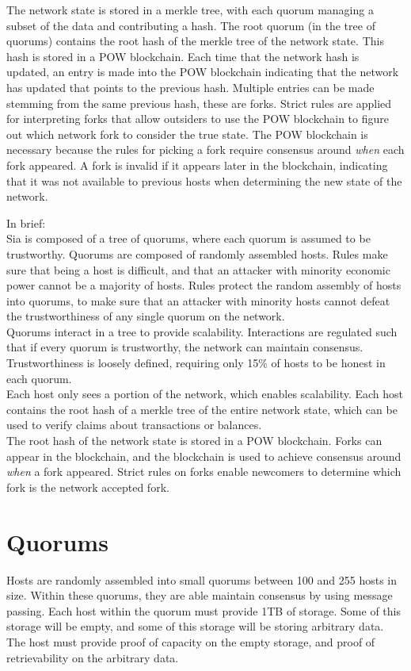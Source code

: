\documentclass[twocolumn]{article}
\begin{document}
The network state is stored in a merkle tree, with each quorum managing a subset of the data and contributing a hash.
The root quorum (in the tree of quorums) contains the root hash of the merkle tree of the network state.
This hash is stored in a POW blockchain.
Each time that the network hash is updated, an entry is made into the POW blockchain indicating that the network has updated that points to the previous hash.
Multiple entries can be made stemming from the same previous hash, these are forks.
Strict rules are applied for interpreting forks that allow outsiders to use the POW blockchain to figure out which network fork to consider the true state.
The POW blockchain is necessary because the rules for picking a fork require consensus around \textit{when} each fork appeared.
A fork is invalid if it appears later in the blockchain, indicating that it was not available to previous hosts when determining the new state of the network.

In brief: \\
Sia is composed of a tree of quorums, where each quorum is assumed to be trustworthy.
Quorums are composed of randomly assembled hosts.
Rules make sure that being a host is difficult, and that an attacker with minority economic power cannot be a majority of hosts.
Rules protect the random assembly of hosts into quorums, to make sure that an attacker with minority hosts cannot defeat the trustworthiness of any single quorum on the network. \\
Quorums interact in a tree to provide scalability.
Interactions are regulated such that if every quorum is trustworthy, the network can maintain consensus.
Trustworthiness is loosely defined, requiring only 15\% of hosts to be honest in each quorum. \\
Each host only sees a portion of the network, which enables scalability.
Each host contains the root hash of a merkle tree of the entire network state, which can be used to verify claims about transactions or balances. \\
The root hash of the network state is stored in a POW blockchain.
Forks can appear in the blockchain, and the blockchain is used to achieve consensus around \textit{when} a fork appeared.
Strict rules on forks enable newcomers to determine which fork is the network accepted fork.

\section{Quorums}
Hosts are randomly assembled into small quorums between 100 and 255 hosts in size.
Within these quorums, they are able maintain consensus by using message passing.
Each host within the quorum must provide 1TB of storage.
Some of this storage will be empty, and some of this storage will be storing arbitrary data.
The host must provide proof of capacity on the empty storage, and proof of retrievability on the arbitrary data.
\end{document}
